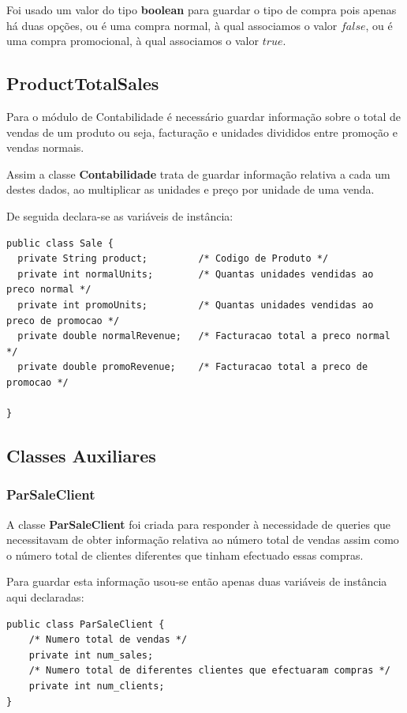 \documentclass[10pt] {article}
\begin{document}
Foi usado um valor do tipo \textbf{boolean} para guardar o tipo de compra pois apenas há duas opções, ou é uma compra
normal, à qual associamos o valor $false$, ou é uma compra promocional, à qual associamos o valor $true$.

\subsection{ProductTotalSales}

Para o módulo de Contabilidade é necessário guardar informação sobre o total de vendas de um produto ou seja, facturação e unidades divididos entre promoção e vendas normais.

Assim a classe \textbf{Contabilidade} trata de guardar informação relativa a cada um destes dados, ao multiplicar as unidades e preço por unidade de uma venda.

De seguida declara-se as variáveis de instância:

\begin{lstlisting}
public class Sale {
  private String product;         /* Codigo de Produto */
  private int normalUnits;        /* Quantas unidades vendidas ao preco normal */
  private int promoUnits;         /* Quantas unidades vendidas ao preco de promocao */
  private double normalRevenue;   /* Facturacao total a preco normal */
  private double promoRevenue;    /* Facturacao total a preco de promocao */

}
\end{lstlisting}

\subsection{Classes Auxiliares}
\subsubsection{ParSaleClient}

A classe \textbf{ParSaleClient} foi criada para responder à necessidade de queries que necessitavam de obter informação
relativa ao número total de vendas assim como o número total de clientes diferentes que tinham efectuado essas compras.

Para guardar esta informação usou-se então apenas duas variáveis de instância aqui declaradas:

\begin{lstlisting}
public class ParSaleClient {
	/* Numero total de vendas */
	private int num_sales;
	/* Numero total de diferentes clientes que efectuaram compras */
	private int num_clients;
}
\end{lstlisting}
\end{document}
